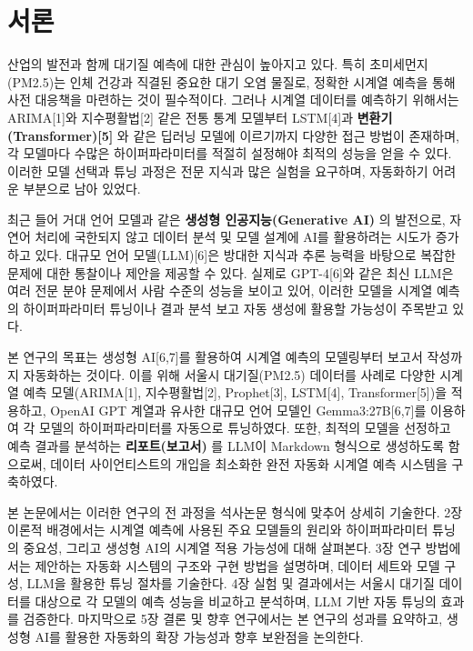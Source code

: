 \documentclass[12pt,ko,a4,]{report}
\begin{document}
\newpage
\tableofcontents
\newpage

\listoffigures
\newpage

\listoftables
\newpage

\chapter{서론}

산업의 발전과 함께 대기질 예측에 대한 관심이 높아지고 있다. 특히
초미세먼지(PM2.5)는 인체 건강과 직결된 중요한 대기 오염 물질로, 정확한
시계열 예측을 통해 사전 대응책을 마련하는 것이 필수적이다. 그러나 시계열
데이터를 예측하기 위해서는 ARIMA{[}1{]}와 지수평활법{[}2{]} 같은 전통
통계 모델부터 LSTM{[}4{]}과 \textbf{변환기(Transformer){[}5{]}} 와 같은
딥러닝 모델에 이르기까지 다양한 접근 방법이 존재하며, 각 모델마다 수많은
하이퍼파라미터를 적절히 설정해야 최적의 성능을 얻을 수 있다. 이러한 모델
선택과 튜닝 과정은 전문 지식과 많은 실험을 요구하며, 자동화하기 어려운
부분으로 남아 있었다.

최근 들어 거대 언어 모델과 같은 \textbf{생성형 인공지능(Generative AI)}
의 발전으로, 자연어 처리에 국한되지 않고 데이터 분석 및 모델 설계에 AI를
활용하려는 시도가 증가하고 있다. 대규모 언어 모델(LLM){[}6{]}은 방대한
지식과 추론 능력을 바탕으로 복잡한 문제에 대한 통찰이나 제안을 제공할 수
있다. 실제로 GPT-4{[}6{]}와 같은 최신 LLM은 여러 전문 분야 문제에서 사람
수준의 성능을 보이고 있어, 이러한 모델을 시계열 예측의 하이퍼파라미터
튜닝이나 결과 분석 보고 자동 생성에 활용할 가능성이 주목받고 있다.

본 연구의 목표는 생성형 AI{[}6,7{]}를 활용하여 시계열 예측의 모델링부터
보고서 작성까지 자동화하는 것이다. 이를 위해 서울시 대기질(PM2.5)
데이터를 사례로 다양한 시계열 예측 모델(ARIMA{[}1{]}, 지수평활법{[}2{]},
Prophet{[}3{]}, LSTM{[}4{]}, Transformer{[}5{]})을 적용하고, OpenAI GPT
계열과 유사한 대규모 언어 모델인 Gemma3:27B{[}6,7{]}를 이용하여 각
모델의 하이퍼파라미터를 자동으로 튜닝하였다. 또한, 최적의 모델을
선정하고 예측 결과를 분석하는 \textbf{리포트(보고서)} 를 LLM이 Markdown
형식으로 생성하도록 함으로써, 데이터 사이언티스트의 개입을 최소화한 완전
자동화 시계열 예측 시스템을 구축하였다.

본 논문에서는 이러한 연구의 전 과정을 석사논문 형식에 맞추어 상세히
기술한다. 2장 이론적 배경에서는 시계열 예측에 사용된 주요 모델들의
원리와 하이퍼파라미터 튜닝의 중요성, 그리고 생성형 AI의 시계열 적용
가능성에 대해 살펴본다. 3장 연구 방법에서는 제안하는 자동화 시스템의
구조와 구현 방법을 설명하며, 데이터 세트와 모델 구성, LLM을 활용한 튜닝
절차를 기술한다. 4장 실험 및 결과에서는 서울시 대기질 데이터를 대상으로
각 모델의 예측 성능을 비교하고 분석하며, LLM 기반 자동 튜닝의 효과를
검증한다. 마지막으로 5장 결론 및 향후 연구에서는 본 연구의 성과를
요약하고, 생성형 AI를 활용한 자동화의 확장 가능성과 향후 보완점을
논의한다.
\end{document}
